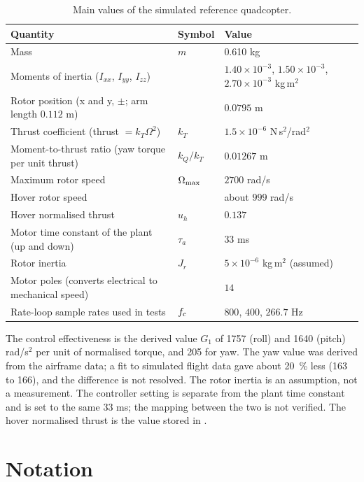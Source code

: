 \begin{table}[tbp]
\caption{Main values of the simulated reference quadcopter.}\label{tab:airframe}
\centering
\small
\begin{tabular}{@{}p{6.6cm} l l@{}}
\toprule
Quantity & Symbol & Value \\
\midrule
Mass & $m$ & 0.610 kg \\
Moments of inertia ($I_{xx}$, $I_{yy}$, $I_{zz}$) & & $1.40\times10^{-3}$, $1.50\times10^{-3}$, $2.70\times10^{-3}$ kg\,m$^2$ \\
Rotor position (x and y, $\pm$; arm length $0.112$ m) & & $0.0795$ m \\
Thrust coefficient (thrust $=k_T\Omega^2$) & $k_T$ & $1.5\times10^{-6}$ N\,s$^2$/rad$^2$ \\
Moment-to-thrust ratio (yaw torque per unit thrust) & $k_Q/k_T$ & $0.01267$ m \\
Maximum rotor speed & $\Omega_{\max}$ & $2700$ rad/s \\
Hover rotor speed & & about $999$ rad/s \\
Hover normalised thrust & $u_h$ & $0.137$ \\
Motor time constant of the plant (up and down) & $\tau_a$ & $33$ ms \\
Rotor inertia & $J_r$ & $5\times10^{-6}$ kg\,m$^2$ (assumed) \\
Motor poles (converts electrical to mechanical speed) & & $14$ \\
Rate-loop sample rates used in tests & $f_{\mathrm{c}}$ & $800$, $400$, $266.7$ Hz \\
\bottomrule
\end{tabular}
\end{table}

The control effectiveness is the derived value $G_1$ of 1757 (roll) and 1640 (pitch) rad/s$^2$ per unit of normalised torque, and 205 for yaw.
The yaw value was derived from the airframe data; a fit to simulated flight data gave about 20~\% less (163 to 166), and the difference is not resolved.
The rotor inertia is an assumption, not a measurement.
The controller setting  is separate from the plant time constant and is set to the same $33$ ms; the mapping between the two is not verified.
The hover normalised thrust is the value stored in .

\section{Notation}\label{sec:notation}

